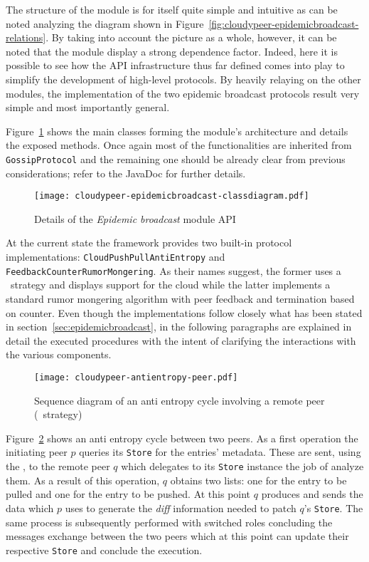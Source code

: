 The structure of the module is for itself quite simple and intuitive as
can be noted analyzing the diagram shown in Figure~\ref{fig:cloudypeer-epidemicbroadcast-relations}. By taking into
account the picture as a whole, however, it can be noted that the module
display a strong dependence factor. Indeed, here it is possible to see how
the API infrastructure thus far defined comes into play to simplify
the development of high-level protocols. By heavily relaying on the
other modules, the implementation of the two epidemic broadcast
protocols result very simple and most importantly general.

Figure~\ref{fig:cloudypeer-epidemicbroadcast-class} shows the main
classes forming the module's architecture and details the exposed
methods. Once again most of the functionalities are inherited from
\texttt{GossipProtocol} and the remaining one should be already clear
from previous considerations; refer to the JavaDoc for further details.

\begin{figure}[h]
  \hspace{-50pt}
  \texttt{[image: cloudypeer-epidemicbroadcast-classdiagram.pdf]}
  \caption{Details of the \textit{Epidemic broadcast} module API}
  \label{fig:cloudypeer-epidemicbroadcast-class}
\end{figure}

At the current state the framework provides two built-in protocol
implementations: \texttt{Cloud\-Push\-Pull\-Anti\-Entropy} and
\texttt{Feedback\-Counter\-Rumor\-Mongering}. As their names suggest, the
former uses a \PUSHPULL\ strategy and displays support for the cloud while
the latter implements a standard rumor mongering algorithm with peer
feedback and termination based on counter.
Even though the implementations follow closely what has been stated in
section~\ref{sec:epidemicbroadcast}, in the following paragraphs are
explained in detail the executed procedures with the intent of
clarifying the interactions with the various \cloudypeer components.

\begin{figure}[h]
  \centering
  \texttt{[image: cloudypeer-antientropy-peer.pdf]}
  \caption{Sequence diagram of an anti entropy cycle involving a remote
    peer (\PUSHPULL\ strategy)}
  \label{fig:cloudypeer-sequence-antientropy-peer}
\end{figure}

Figure~\ref{fig:cloudypeer-sequence-antientropy-peer} shows an
anti entropy cycle between two peers. As a first operation the
initiating peer $p$ queries its \texttt{Store} for the entries'
metadata. These are sent, using the \networkhelper, to the remote
peer $q$ which delegates to its \texttt{Store} instance the job of
analyze them. As a result of this operation, $q$ obtains two lists:
one for the entry to be pulled and one for the entry to be pushed.
At this point $q$ produces and sends the data which  $p$ uses to generate
the \textit{diff} information needed to patch $q$'s \texttt{Store}. The
same process is subsequently performed with switched roles concluding
the messages exchange between the two peers which at this point can
update their respective \texttt{Store} and conclude the execution.

